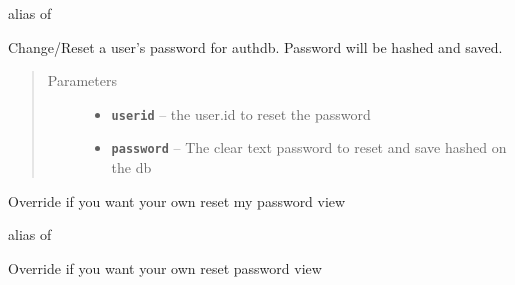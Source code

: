 \documentclass[letterpaper,10pt,english]{sphinxmanual}
\begin{document}
\begin{fulllineitems}
\begin{fulllineitems}
alias of 

\end{fulllineitems}


\begin{fulllineitems}
\label{api:flask.ext.appbuilder.security.manager.BaseSecurityManager.reset_password}
Change/Reset a user's password for authdb.
Password will be hashed and saved.
\begin{quote}\begin{description}
\item[{Parameters}] \leavevmode\begin{itemize}
\item {} 
\textbf{\texttt{userid}} -- the user.id to reset the password

\item {} 
\textbf{\texttt{password}} -- The clear text password to reset and save hashed on the db

\end{itemize}

\end{description}\end{quote}

\end{fulllineitems}


\begin{fulllineitems}
\label{api:flask.ext.appbuilder.security.manager.BaseSecurityManager.resetmypasswordview}
Override if you want your own reset my password view

alias of 

\end{fulllineitems}


\begin{fulllineitems}
\label{api:flask.ext.appbuilder.security.manager.BaseSecurityManager.resetpasswordview}
Override if you want your own reset password view


\end{fulllineitems}
\end{fulllineitems}
\end{document}
